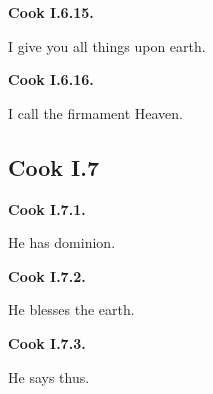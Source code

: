 \par\begin{minipage}{\linewidth}\raggedright
\textbf{Cook I.6.15.}

I give you all things upon earth.

\end{minipage}\par\addvspace{4pt}

\par\begin{minipage}{\linewidth}\raggedright
\textbf{Cook I.6.16.}

I call the firmament Heaven.

\end{minipage}\par\addvspace{4pt}

\subsection*{Cook I.7}

\par\begin{minipage}{\linewidth}\raggedright
\textbf{Cook I.7.1.}

He has dominion.

\end{minipage}\par\addvspace{4pt}

\par\begin{minipage}{\linewidth}\raggedright
\textbf{Cook I.7.2.}

He blesses the earth.

\end{minipage}\par\addvspace{4pt}

\par\begin{minipage}{\linewidth}\raggedright
\textbf{Cook I.7.3.}

He says thus.

\end{minipage}\par\addvspace{4pt}

